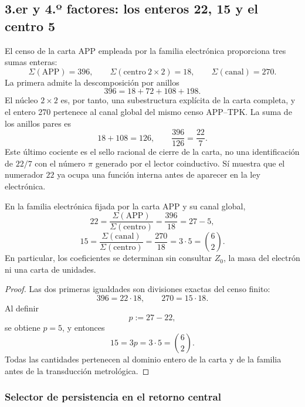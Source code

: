 \subsection{3.er y 4.º factores: los enteros 22, 15 y el centro 5}

El censo de la carta APP empleada por la familia electrónica proporciona
tres sumas enteras:
\[
 \Sigma(\mathrm{APP})=396,
 \qquad
 \Sigma(\mathrm{centro}\ 2\times2)=18,
 \qquad
 \Sigma(\mathrm{canal})=270.
\]
La primera admite la descomposición por anillos
\[
 396=18+72+108+198.
\]
El núcleo \(2\times2\) es, por tanto, una subestructura explícita de la
carta completa, y el entero 270 pertenece al canal global del mismo censo
APP--TPK.
La suma de los anillos pares es
\[
 18+108=126,
 \qquad
 \frac{396}{126}=\frac{22}{7}.
\]
Este último cociente es el sello racional de cierre de la carta, no una
identificación de \(22/7\) con el número \(\pi\) generado por el lector
coinductivo. Sí muestra que el numerador \(22\) ya ocupa una función
interna antes de aparecer en la ley electrónica.

\begin{theorem}
\label{p12-83-c15-s2:thm:coeficientes-electron-rev6}
En la familia electrónica fijada por la carta APP y su canal global,
\[
 \boxed{
 22=\frac{\Sigma(\mathrm{APP})}
 {\Sigma(\mathrm{centro})}
 =\frac{396}{18}=27-5,}
\]
\[
 \boxed{
 15=\frac{\Sigma(\mathrm{canal})}
 {\Sigma(\mathrm{centro})}
 =\frac{270}{18}=3\cdot5=\binom62.}
\]
En particular, los coeficientes se determinan sin consultar
\(Z_0\), la masa del electrón ni una carta de unidades.
\end{theorem}

\begin{proof}
Las dos primeras igualdades son divisiones exactas del censo finito:
\[
 396=22\cdot18,
 \qquad
 270=15\cdot18.
\]
Al definir
\[
 p:=27-22,
\]
se obtiene \(p=5\), y entonces
\[
 15=3p=3\cdot5=\binom62.
\]
Todas las cantidades pertenecen al dominio entero de la carta y de la
familia antes de la transducción metrológica.
\end{proof}

\subsubsection{Selector de persistencia en el retorno central}

